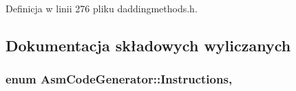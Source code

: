 Definicja w linii 276 pliku daddingmethods.\-h.



\subsection{Dokumentacja składowych wyliczanych}
\hypertarget{class_asm_code_generator_a975bb037f383eb14e8f21acc7c4cd9a8}{
\subsubsection[{Instructions}]{\setlength{\rightskip}{0pt plus 5cm}enum {\bf Asm\-Code\-Generator\-::\-Instructions}\hspace{0.3cm}{\ttfamily [strong]}, {\ttfamily [private]}}}\label{class_asm_code_generator_a975bb037f383eb14e8f21acc7c4cd9a8}

